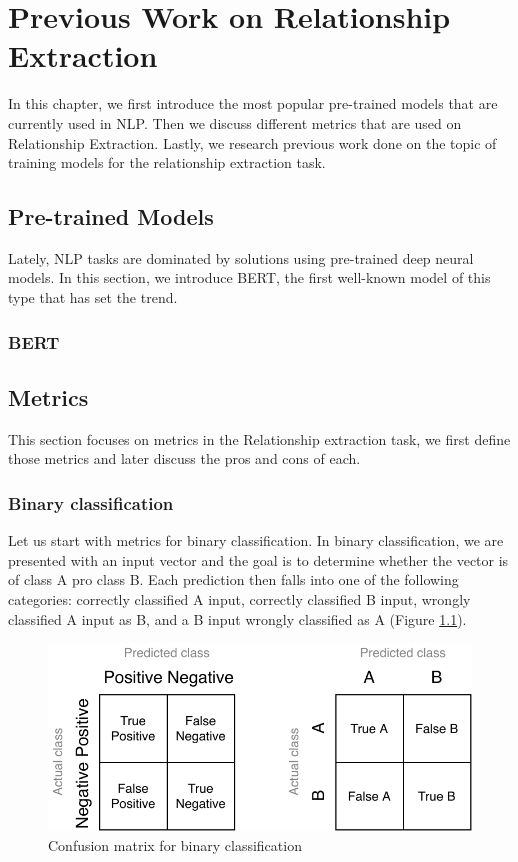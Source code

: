 \chapter{Previous Work on Relationship Extraction}
In this chapter, we first introduce the most popular pre-trained models that are currently used in NLP. Then we discuss different metrics that are used on Relationship Extraction. Lastly, we research previous work done on the topic of training models for the relationship extraction task.

\section{Pre-trained Models}
Lately, NLP tasks are dominated by solutions using pre-trained deep neural models. In this section, we introduce BERT, the first well-known model of this type that has set the trend.
\subsection{BERT}


\section{Metrics}
This section focuses on metrics in the Relationship extraction task, we first define those metrics and later discuss the pros and cons of each.

\subsection{Binary classification}

Let us start with metrics for binary classification. In binary classification, we are presented with an input vector and the goal is to determine whether the vector is of class A pro class B. Each prediction then falls into one of the following categories: correctly classified A input, correctly classified B input, wrongly classified A input as B, and a B input wrongly classified as A (Figure \ref{obr:CM}). 

\begin{figure}[h]\centering
\includegraphics[width=140mm]{./img//Diplomka diagramy-Confusion matric}
\caption{Confusion matrix for binary classification}
\label{obr:CM}
\end{figure}


